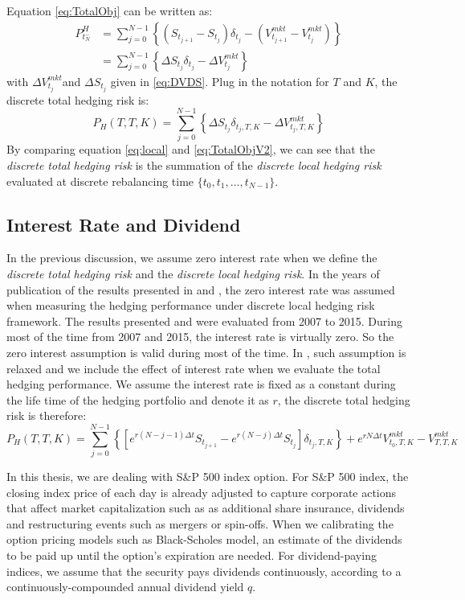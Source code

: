 \documentclass[letterpaper,12pt,titlepage,oneside,final]{book}
\numberwithin{equation}{section}
\theoremstyle{definition}
\newcommand{\DS}{\Delta S}
\newcommand{\Vmkt}{V^{mkt}}
\newcommand{\Smkt}{S}
\begin{document}
Equation \eqref{eq:TotalObj} can be written as:
\[
\begin{split}
P^H_{t_N^-}&=\sum_{j=0}^{N-1}\left\{ \left( S_{t_{j+1}}-S_{t_{j}}\right) \delta_{t_j} -(V_{t_{j+1}}^{mkt}-V_{t_j}^{mkt}) \right\}\\
&=\sum_{j=0}^{N-1}\left\{ \DS_{t_j} \delta_{t_j} -\Delta V^{mkt}_{t_j} \right\}
\end{split}
\label{eq:TotalObjV2}
\]
with $\Delta V^{mkt}_{t_j}$and  $\DS_{t_j}$ given in \eqref{eq:DVDS}.
Plug in the notation for $T$ and $K$, the discrete total hedging risk is:
\begin{equation}
    P_H(T,T,K)=\sum_{j=0}^{N-1}\left\{ \Delta \Smkt_{t_j} \delta_{t_j,T,K} -\Delta \Vmkt_{t_j,T,K} \right\}
    \label{eq:TotalObjV2}
    \end{equation}
By comparing equation \eqref{eq:local} and \eqref{eq:TotalObjV2}, we can see that the {\em discrete total hedging risk} is the summation of the {\em discrete local hedging risk} evaluated at discrete rebalancing time $\{t_0,t_1,\dots,t_{N-1}\}$. 
\subsection{Interest Rate and Dividend}
In the previous discussion, we assume zero interest rate  when we define the {\em discrete total hedging risk} and the {\em discrete local hedging risk}. In the years of publication of the results presented in \cite{knian2017} and \cite{knian2019}, the zero interest rate  was assumed when measuring the hedging performance under discrete local hedging risk framework. The results presented \cite{knian2017} and \cite{knian2019} were evaluated from 2007 to 2015. During  most of the time from 2007 and 2015, the interest rate is virtually zero. So the zero interest assumption is valid during most of the time.  In \cite{knian2020}, such assumption is relaxed and we include the effect of interest rate when we evaluate the total hedging performance. We assume the interest rate is fixed as a constant during the life time of the hedging portfolio and denote it as $r$, the discrete total hedging risk is therefore:
\begin{equation}
    P_H(T,T,K)=\sum_{j=0}^{N-1}\left\{ \left[e^{r (N-j-1) \Delta t} \Smkt_{t_{j+1}}-e^{r (N-j) \Delta t}\Smkt_{t_{j}}\right] \delta_{t_j,T,K} \right\}+e^{r N \Delta t} \Vmkt_{t_0,T,K}-\Vmkt_{T,T,K}
    \label{eq:TotalObjV3}
\end{equation}

In this thesis, we are dealing with S\&P 500 index option. For S\&P 500 index, the closing index price of each day is already adjusted to capture corporate actions that affect market capitalization such as as additional share insurance, dividends and restructuring events such as mergers or spin-offs\cite{lassance2018comparison}. When we calibrating the  option pricing models such as Black-Scholes model,   an estimate of the dividends to be paid up until the option’s expiration are needed. For dividend-paying indices, we assume that the security pays dividends continuously, according to a continuously-compounded annual dividend yield $q$. 
\end{document}
